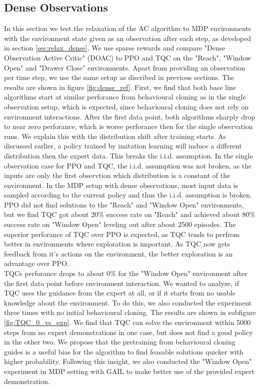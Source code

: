 \subsection{Dense Observations}
In this section we test the relaxation of the AC algorithm to MDP environments with the environment state given as an observation after each step, as developed in section \ref{sec:relax_dense}. 
We use sparse rewards 
and compare "Dense Observation Active Critic" (DOAC) to PPO and TQC on the "Reach", "Window Open" and "Drawer Close" environments. Apart from 
providing an observation per time step,
we use the same setup as discribed in previous sections. The results are shown in figure \ref{fig:dense_ref}. First, we find that both base line algorithms 
start at similar perforance from behavioural cloning as in the single observation setup, which is expected, since behavioural cloning does not rely on 
environment interactions. After the first data point, both algorithms sharply drop to near zero perforance, which is worse perforance then for the single 
observation runs. We explain this with the distribution shift after training starts. As discussed earlier, a policy trained by imitation learning 
will induce a different distribution then the expert data. This breaks the i.i.d. assumption. In the single observation case for PPO and TQC, the i.i.d. assumption was not broken, 
as the inputs are only the first observtion which distribution is a constant of the environment. In the MDP setup with dense observations, most input data is 
sampled according to the current policy and thus the i.i.d. assumption is broken. PPO did not find solutions to the "Reach" and "Window Open" environments, 
but we find TQC got about $20 \%$ success rate on "Reach" and achieved about $80 \%$ success rate on "Window Open" leveling out after about 2500 episodes. 
The superior perforance of TQC over PPO is expected, as TQC tends to perfrom better in environments where exploration is important. As TQC now gets 
feedback from it's actions on the environment, the better exploration is an advantage over PPO.\\ 
TQCs perforance drops to about $0 \%$ for the "Window Open" 
environment after the first data point before environment interaction. We wanted to analyze, if TQC uses the guidance from the expert at all, or if it starts from 
no usable knowledge about the environment. To do this, we also conducted the experiment three times with no initial behavioural cloning. The results are shown in 
subfigure \ref{fig:TQC_0_vs_exp}. We find that TQC can solve the environment within 5000 steps from no expert demonstrations in one case, but does not find a good policy in the other two. 
We propose that the pretraining from behavioural cloning guides is a useful bias for the algorithm to find feasable solutions quicker with higher probability. Following this insight, 
we also conducted the "Window Open" experiment in MDP setting with GAIL to make better use of the provided expert demonstration. 

